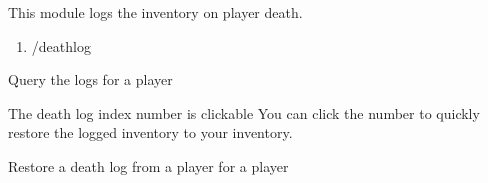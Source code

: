 
This module logs the inventory on player death.

\begin{enumerate}
    \item /deathlog
\end{enumerate}


\begin{example}{Query the logs for a player}

    \begin{tips}{The death log index number is clickable}
        You can click the number to quickly restore the logged inventory to your inventory.
    \end{tips}
\end{example}

\begin{example}{Restore a death log from a player for a player}
\end{example}
